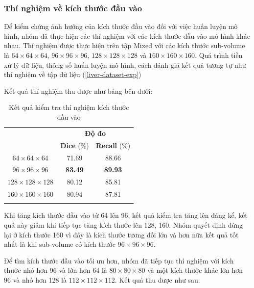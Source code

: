 \subsubsection{Thí nghiệm về kích thước đầu vào} \label{liver-input-size}
Để kiểm chứng ảnh hưởng của kích thước đầu vào đối với việc huấn luyện mô hình, nhóm đã thực hiện các thí nghiệm với các kích thước đầu vào mô hình khác nhau.
Thí nghiệm được thực hiện trên tập Mixed với các kích thước sub-volume là $64 \times 64 \times 64$, $96 \times 96 \times 96$, $128 \times 128 \times 128$ và $160 \times 160 \times 160$. Quá trình tiền xử lý dữ liệu, thông số huấn luyện mô hình, cách đánh giá kết quả tương tự như thí nghiệm về tập dữ liệu (\ref{liver-dataset-exp}) \par
Kết quả thí nghiệm thu được như bảng bên dưới:
\begin{table}[H]
\renewcommand{\arraystretch}{1.2}
\centering
\begin{tabular}{c|c|c}

\Xhline{3\arrayrulewidth}
\multirow{2}{*}{\textbf{Thí nghiệm}} & \multicolumn{2}{c}{\textbf{Độ đo}}        \\ \cline{2-3} 
                                     & \textbf{Dice} (\%) & \textbf{Recall} (\%) \\ \hline
$64 \times 64 \times 64$        & 71.69          & 88.66          \\ \hline
$96 \times 96 \times 96$        & \textbf{83.49} & \textbf{89.93} \\ \hline
$128 \times 128 \times 128$     & 80.12          & 85.81          \\ \hline
$160 \times 160 \times 160$     & 80.94          & 87.81          \\
\Xhline{3\arrayrulewidth}
\end{tabular}
\caption{Kết quả kiểm tra thí nghiệm kích thước đầu vào}
\end{table}
Khi tăng kích thước đầu vào từ 64 lên 96, kết quả kiểm tra tăng lên đáng kể, kết quả này giảm khi tiếp tục tăng kích thước lên 128, 160. Nhóm quyết định dừng lại ở kích thước 160 vì đây là kích thước tương đối lớn và hơn nữa kết quả tốt nhất là khi sub-volume có kích thước $96 \times 96 \times 96$. \par
Để tìm kích thước đầu vào tối ưu hơn, nhóm đã tiếp tục thí nghiệm với kích thước nhỏ hơn 96 và lớn hơn 64 là $80 \times 80 \times 80$ và một kích thước khác lớn hơn 96 và nhỏ hơn 128 là $112 \times 112 \times 112$. Kết quả thu được như sau:\par
